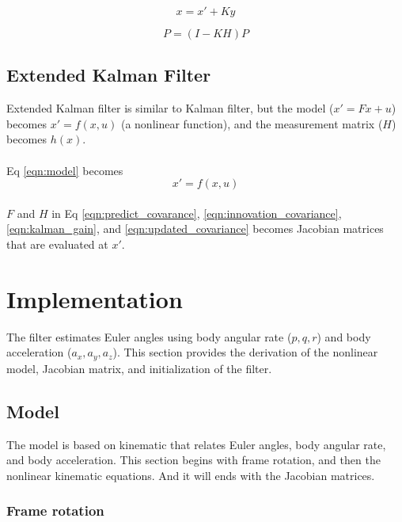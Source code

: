 \documentclass[]{article}
\begin{document}
\begin{equation}
x = x' + Ky\label{eqn:updated_states}
\end{equation}

\begin{equation}
P = (I-KH)P\label{eqn:updated_covariance}
\end{equation}

\subsection{Extended Kalman Filter}
Extended Kalman filter is similar to Kalman filter, but the model ($x' = Fx + u$) becomes $x' = f(x,u)$ (a nonlinear function), and the measurement matrix ($H$) becomes $h(x)$.

\paragraph*{}
Eq \eqref{eqn:model} becomes
\begin{equation}
x' = f(x, u)
\end{equation}

\paragraph*{}
$F$ and $H$ in Eq \eqref{eqn:predict_covarance}, \eqref{eqn:innovation_covariance}, \eqref{eqn:kalman_gain}, and \eqref{eqn:updated_covariance} becomes Jacobian matrices that are evaluated at $x'$.

\section{Implementation}
The filter estimates Euler angles using body angular rate ($p, q, r$) and body acceleration ($a_x, a_y, a_z$). This section provides the derivation of the nonlinear model, Jacobian matrix, and initialization of the filter.

\subsection{Model}
The model is based on kinematic that relates Euler angles, body angular rate, and body acceleration. This section begins with frame rotation, and then the nonlinear kinematic equations. And it will ends with the Jacobian matrices. 

\subsubsection{Frame rotation}
\end{document}

